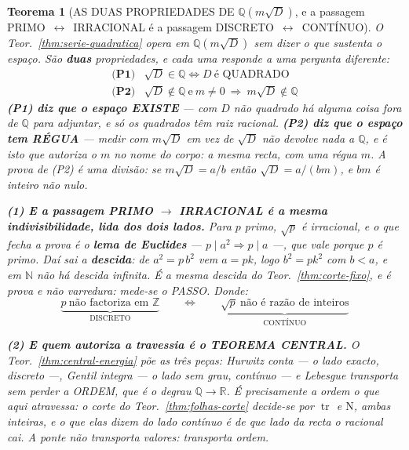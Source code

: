 \documentclass[11pt,a4paper]{article}
\newtheorem{teorema}{Teorema}
\begin{document}
\begin{teorema}[AS DUAS PROPRIEDADES DE $\mathbb{Q}(m\sqrt D)$, e a passagem
PRIMO~$\leftrightarrow$~IRRACIONAL é a passagem DISCRETO~$\leftrightarrow$~CONTÍNUO]%
\label{thm:duas-propriedades}
O Teor.~\ref{thm:serie-quadratica} opera em $\mathbb{Q}(m\sqrt D)$ sem dizer o que sustenta
o espaço. São \textbf{duas} propriedades, e cada uma responde a uma pergunta diferente:
\[
\boxed{
\begin{array}{ll}
\textbf{(P1)} & \sqrt D\in\mathbb{Q}\iff D\ \text{é QUADRADO}\\[3pt]
\textbf{(P2)} & \sqrt D\notin\mathbb{Q}\ \text{e}\ m\neq0\ \Longrightarrow\
m\sqrt D\notin\mathbb{Q}
\end{array}}
\]
\textbf{(P1) diz que o espaço EXISTE} --- com $D$ não quadrado há alguma coisa fora de
$\mathbb{Q}$ para adjuntar, e \emph{só os quadrados têm raiz racional}. \textbf{(P2) diz
que o espaço tem RÉGUA} --- medir com $m\sqrt D$ em vez de $\sqrt D$ não devolve nada a
$\mathbb{Q}$, e é isto que autoriza o $m$ no nome do corpo: \emph{a mesma recta, com uma
régua $m$}. A prova de (P2) é uma divisão: se $m\sqrt D=a/b$ então $\sqrt D=a/(bm)$, e
$bm$ é inteiro não nulo.

\textbf{(1) E a passagem PRIMO $\to$ IRRACIONAL é a mesma indivisibilidade, lida dos dois
lados.} Para $p$ primo, $\sqrt p$ é irracional, e o que fecha a prova é o \textbf{lema de
Euclides} --- $p\mid a^{2}\Rightarrow p\mid a$ ---, que vale \emph{porque} $p$ é primo. Daí
sai a \textbf{descida}: de $a^{2}=p\,b^{2}$ vem $a=pk$, logo $b^{2}=pk^{2}$ com $b<a$, e em
$\mathbb{N}$ não há descida infinita. \emph{É a mesma descida do Teor.~\ref{thm:corte-fixo},
e é prova e não varredura: mede-se o PASSO.} Donde:
\[
\underbrace{p\ \text{não factoriza em }\mathbb{Z}}_{\text{DISCRETO}}
\qquad\Longleftrightarrow\qquad
\underbrace{\sqrt p\ \text{não é razão de inteiros}}_{\text{CONTÍNUO}}
\]

\textbf{(2) E quem autoriza a travessia é o TEOREMA CENTRAL.} O
Teor.~\ref{thm:central-energia} põe as três peças: \emph{Hurwitz conta} --- o lado exacto,
discreto ---, \emph{Gentil integra} --- o lado sem grau, contínuo --- e \emph{Lebesgue
transporta sem perder a ORDEM}, que é o degrau $\mathbb{Q}\to\mathbb{R}$. É precisamente a
ordem o que aqui atravessa: o corte do Teor.~\ref{thm:folhas-corte} decide-se por
$\operatorname{tr}$ e $\mathrm{N}$, ambas inteiras, e o que elas dizem do lado contínuo é de
que lado da recta o racional cai. \emph{A ponte não transporta valores: transporta ordem.}


\end{teorema}
\end{document}
